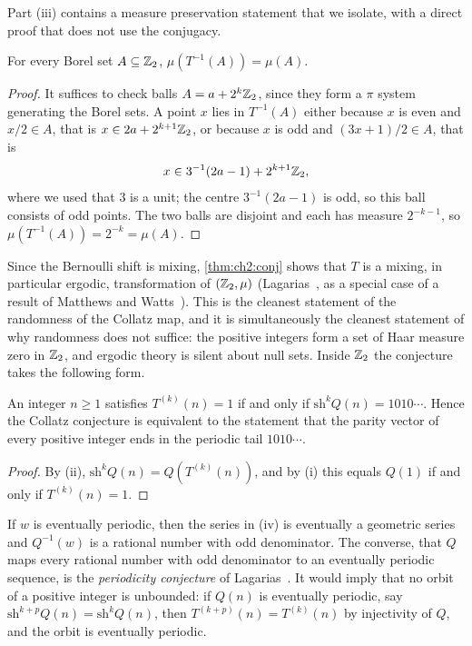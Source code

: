 Part (iii) contains a measure preservation statement that we isolate, with a
direct proof that does not use the conjugacy.

\begin{proposition}\label{prop:ch2:haar}
For every Borel set $A\subseteq\mathbb{Z}_2$, $\mu(T^{-1}(A))=\mu(A)$.
\end{proposition}

\begin{proof}
It suffices to check balls $A=a+2^k\mathbb{Z}_2$, since they form a $\pi$ system
generating the Borel sets. A point $x$ lies in $T^{-1}(A)$ either because $x$
is even and $x/2\in A$, that is $x\in2a+2^{k+1}\mathbb{Z}_2$, or because $x$ is odd
and $(3x+1)/2\in A$, that is
\[
  x\in3^{-1}(2a-1)+2^{k+1}\mathbb{Z}_2 ,
\]
where we used that $3$ is a unit; the centre $3^{-1}(2a-1)$ is odd, so this
ball consists of odd points. The two balls are disjoint and each has measure
$2^{-k-1}$, so $\mu(T^{-1}(A))=2^{-k}=\mu(A)$.
\end{proof}

Since the Bernoulli shift is mixing, \cref{thm:ch2:conj} shows that $T$ is a
mixing, in particular ergodic, transformation of $(\mathbb{Z}_2,\mu)$ (Lagarias~\cite[Theorem~K]{lagarias1985}, as a special case of a result of Matthews and Watts~\cite{matthews1984}).
This is the
cleanest statement of the randomness of the Collatz map, and it is
simultaneously the cleanest statement of why randomness does not suffice: the
positive integers form a set of Haar measure zero in $\mathbb{Z}_2$, and ergodic
theory is silent about null sets. Inside $\mathbb{Z}_2$ the conjecture takes the
following form.

\begin{corollary}\label{cor:ch2:tail}
An integer $n\geq1$ satisfies $T^{(k)}(n)=1$ if and only if $\mathrm{sh}^kQ(n)=1010\cdots$.
Hence the Collatz conjecture is equivalent to the statement that the parity
vector of every positive integer ends in the periodic tail $1010\cdots$.
\end{corollary}

\begin{proof}
By (ii), $\mathrm{sh}^kQ(n)=Q(T^{(k)}(n))$, and by (i) this equals $Q(1)$ if and
only if $T^{(k)}(n)=1$.
\end{proof}

\begin{remark}\label{rem:ch2:periodic}
If $w$ is eventually periodic, then the series in (iv) is eventually a
geometric series and $Q^{-1}(w)$ is a rational number with odd denominator.
The converse, that $Q$ maps every rational number with odd denominator to an
eventually periodic sequence, is the \emph{periodicity conjecture} of
Lagarias~\cite{lagarias1985,lagarias1990}. It would imply that no orbit of a
positive integer is unbounded: if $Q(n)$ is eventually periodic, say
$\mathrm{sh}^{k+p}Q(n)=\mathrm{sh}^kQ(n)$, then $T^{(k+p)}(n)=T^{(k)}(n)$ by
injectivity of $Q$, and the orbit is eventually periodic.
\end{remark}

